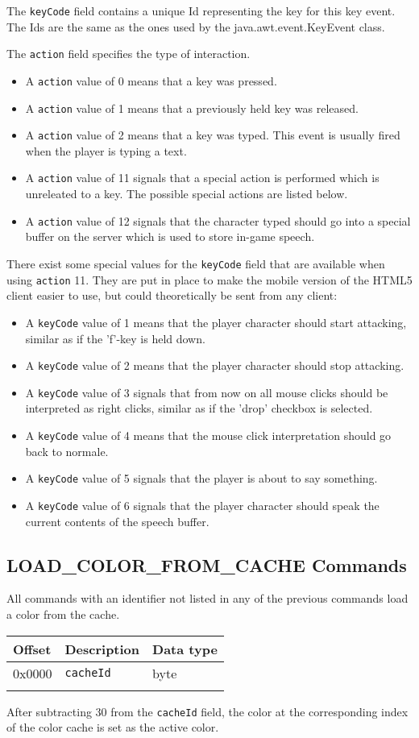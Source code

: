 \documentclass{article}
\newcommand{\field}[1]{\textcolor{fieldColor}{\texttt{#1}}}
\newenvironment{bytelisting}
{\ttfamily \begin{center} \begin{tabular}{l l l} Offset & Description & Data type \\ \hline}
{\normalfont \end{tabular} \end{center}}
\begin{document}
The \field{keyCode} field contains a unique Id representing the key for this key event. The Ids are the same as the ones used by the java.awt.event.KeyEvent class.

The \field{action} field specifies the type of interaction.
\begin{itemize}
\item A \field{action} value of 0 means that a key was pressed.
\item A \field{action} value of 1 means that a previously held key was released.
\item A \field{action} value of 2 means that a key was typed. This event is usually fired when the player is typing a text.
\item A \field{action} value of 11 signals that a special action is performed which is unreleated to a key. The possible special actions are listed below.
\item A \field{action} value of 12 signals that the character typed should go into a special buffer on the server which is used to store in-game speech.
\end{itemize}

There exist some special values for the \field{keyCode} field that are available when using \field{action} 11. They are put in place to make the mobile version of the HTML5 client easier to use, 
but could theoretically be sent from any client:
\begin{itemize}
\item A \field{keyCode} value of 1 means that the player character should start attacking, similar as if the 'f'-key is held down.
\item A \field{keyCode} value of 2 means that the player character should stop attacking.
\item A \field{keyCode} value of 3 signals that from now on all mouse clicks should be interpreted as right clicks, similar as if the 'drop' checkbox is selected.
\item A \field{keyCode} value of 4 means that the mouse click interpretation should go back to normale.
\item A \field{keyCode} value of 5 signals that the player is about to say something.
\item A \field{keyCode} value of 6 signals that the player character should speak the current contents of the speech buffer.
\end{itemize}

\subsection{LOAD\_COLOR\_FROM\_CACHE Commands}
All commands with an identifier not listed in any of the previous commands load a color from the cache. 

\begin{bytelisting}
0x0000 & \field{cacheId} & byte \\
\end{bytelisting}

After subtracting 30 from the \field{cacheId} field, the color at the corresponding index of the color cache is set as the active color.
\end{document}

